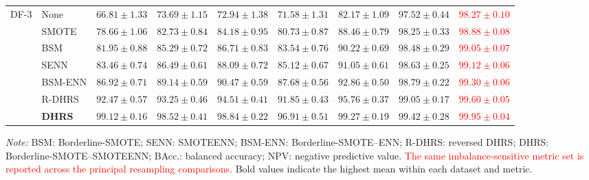 \documentclass[pdflatex,sn-mathphys-num]{sn-jnl}%
\theoremstyle{thmstyleone}%
\theoremstyle{thmstyletwo}%
\theoremstyle{thmstylethree}%
\begin{document}
\begin{table}[!ht]
{\begin{tabular}{@{}llccccccc@{}}
\midrule

\multirow{7}{*}{DF-3}

& None
& $66.81\pm1.33$
& $73.69\pm1.15$
& $72.94\pm1.38$
& $71.58\pm1.31$
& $82.17\pm1.09$
& $97.52\pm0.44$
& \textcolor{red}{$98.27\pm0.10$} \\

& SMOTE
& $78.66\pm1.06$
& $82.73\pm0.84$
& $84.18\pm0.95$
& $80.73\pm0.87$
& $88.46\pm0.79$
& $98.25\pm0.33$
& \textcolor{red}{$98.88\pm0.08$} \\

& BSM
& $81.95\pm0.88$
& $85.29\pm0.72$
& $86.71\pm0.83$
& $83.54\pm0.76$
& $90.22\pm0.69$
& $98.48\pm0.29$
& \textcolor{red}{$99.05\pm0.07$} \\

& SENN
& $83.46\pm0.74$
& $86.49\pm0.61$
& $88.09\pm0.72$
& $85.12\pm0.67$
& $91.05\pm0.61$
& $98.63\pm0.25$
& \textcolor{red}{$99.12\pm0.06$} \\

& BSM-ENN
& $86.92\pm0.71$
& $89.14\pm0.59$
& $90.47\pm0.59$
& $87.68\pm0.56$
& $92.86\pm0.50$
& $98.79\pm0.22$
& \textcolor{red}{$99.30\pm0.06$} \\

& R-DHRS
& $92.47\pm0.57$
& $93.25\pm0.46$
& $94.51\pm0.41$
& $91.85\pm0.43$
& $95.76\pm0.37$
& $99.05\pm0.17$
& \textcolor{red}{$99.60\pm0.05$} \\

& \textbf{DHRS}
& \textbf{$99.12\pm0.16$}
& \textbf{$98.52\pm0.41$}
& \textbf{$98.84\pm0.22$}
& \textbf{$96.91\pm0.51$}
& \textbf{$99.27\pm0.19$}
& \textbf{$99.42\pm0.28$}
& \textcolor{red}{\textbf{$99.95\pm0.04$}} \\

\bottomrule
\end{tabular}%
}

\vspace{2pt}
\begin{minipage}{0.98\textwidth}
\footnotesize
\textit{Note:}
BSM: Borderline-SMOTE; SENN: SMOTEENN; BSM-ENN: Borderline-SMOTE--ENN;
R-DHRS: reversed DHRS; DHRS: Borderline-SMOTE--SMOTEENN;
BAcc.: balanced accuracy; NPV: negative predictive value.
\textcolor{red}{
The same imbalance-sensitive metric set is reported across the principal
resampling comparisons.
}
Bold values indicate the highest mean within each dataset and metric.
\end{minipage}

\end{table}
\endgroup
\end{document}
